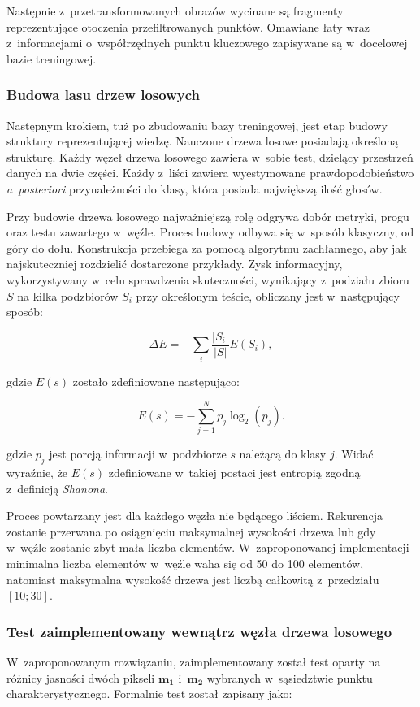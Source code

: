     Następnie z~przetransformowanych obrazów wycinane są fragmenty reprezentujące otoczenia przefiltrowanych punktów. Omawiane łaty wraz z~informacjami o~współrzędnych punktu kluczowego zapisywane są w~docelowej bazie treningowej.

    \subsubsection{Budowa lasu drzew losowych}
    Następnym krokiem, tuż po zbudowaniu bazy treningowej, jest etap budowy struktury reprezentującej wiedzę. Nauczone drzewa losowe posiadają określoną strukturę. Każdy węzeł drzewa losowego zawiera w~sobie test, dzielący przestrzeń danych na dwie części. Każdy z~liści zawiera wyestymowane prawdopodobieństwo \textit{a~posteriori} przynależności do klasy, która posiada największą ilość głosów.

    Przy budowie drzewa losowego najważniejszą rolę odgrywa dobór metryki, progu oraz testu zawartego w~węźle. Proces budowy odbywa się w~sposób klasyczny, od góry do dołu. Konstrukcja przebiega za pomocą algorytmu zachłannego, aby jak najskuteczniej rozdzielić dostarczone przykłady. Zysk informacyjny, wykorzystywany w~celu sprawdzenia skuteczności, wynikający z~podziału zbioru $S$ na kilka podzbiorów $S_i$ przy określonym teście, obliczany jest w~następujący sposób:

    \[
        \Delta E = - \sum\limits_{i} \frac{|S_{i}|}{|S|} E(S_{i}),
    \]

    gdzie $E(s)$ zostało zdefiniowane następująco:

    \[
        E(s) = - \sum\limits_{j=1}^{N} p_{j} \log_{2}(p_{j}).
    \]

    gdzie $p_{j}$ jest porcją informacji w~podzbiorze $s$ należącą do klasy $j$. Widać wyraźnie, że $E(s)$ zdefiniowane w~takiej postaci jest entropią zgodną z~definicją \textit{Shanona}.

    Proces powtarzany jest dla każdego węzła nie będącego liściem. Rekurencja zostanie przerwana po osiągnięciu maksymalnej wysokości drzewa lub gdy w~węźle zostanie zbyt mała liczba elementów. W~zaproponowanej implementacji minimalna liczba elementów w~węźle waha się od 50 do 100 elementów, natomiast maksymalna wysokość drzewa jest liczbą całkowitą z~przedziału $[10; 30]$.

    \subsubsection{Test zaimplementowany wewnątrz węzła drzewa losowego}
    W~zaproponowanym rozwiązaniu, zaimplementowany został test oparty na różnicy jasności dwóch pikseli $\mathbf{m_{1}}$ i~$\mathbf{m_{2}}$ wybranych w~sąsiedztwie punktu charakterystycznego. Formalnie test został zapisany jako:

